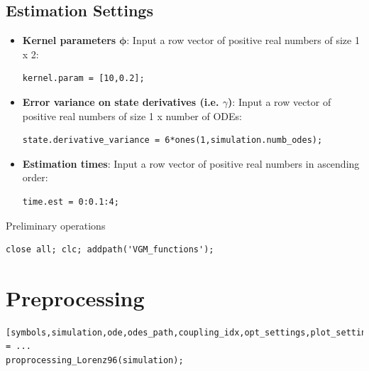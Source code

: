 \subsection{Estimation Settings}

\vspace{1em}
\begin{itemize}
   \item \textbf{Kernel parameters} $\boldsymbol\phi$: Input a row vector of positive real numbers of size 1 x 2:
    \color{RoyalPurple}\begin{verbatim}
kernel.param = [10,0.2];
\end{verbatim} 
\color{black}

   \item \textbf{Error variance on state derivatives (i.e. $\gamma$)}: Input a row vector of positive real numbers of size 1 x number of ODEs:
\color{black}
    \color{RoyalPurple}\begin{verbatim}
state.derivative_variance = 6*ones(1,simulation.numb_odes);
\end{verbatim} 
\color{black}
   \item \textbf{Estimation times}: Input a row vector of positive real numbers in ascending
order:
    \color{RoyalPurple}\begin{verbatim}
time.est = 0:0.1:4;
\end{verbatim} 
\color{black}
\end{itemize}

\vspace{2em}
\begin{par}
Preliminary operations
\end{par} \vspace{1em}
\color{RoyalPurple}\begin{verbatim}
close all; clc; addpath('VGM_functions');
\end{verbatim} 
\color{black}


\section{Preprocessing}

\color{RoyalPurple}\begin{verbatim}
[symbols,simulation,ode,odes_path,coupling_idx,opt_settings,plot_settings] = ...
proprocessing_Lorenz96(simulation);
\end{verbatim} 

